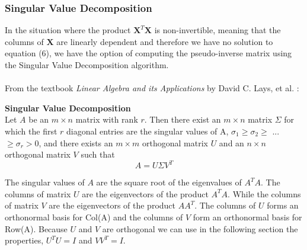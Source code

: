 \documentclass[a4paper,twocolumn]{article}
\newcommand{\X}{\mathbf{X}}
\begin{document}
\subsubsection{Singular Value Decomposition}
In the situation where the product $\X^{T}\X$ is non-invertible, meaning that the columns of $\X$ are linearly dependent and therefore we have no solution to equation (6), we have the option of computing the pseudo-inverse matrix using the Singular Value Decomposition algorithm.\\
\\
From the textbook \textit{Linear Algebra and its Applications} by David C. Lays, et al. \cite{linalg}:
\begin{tcolorbox}[colback=blue!8]
\textbf{Singular Value Decomposition}\\
Let $A$ be an $m \times n$ matrix with rank $r$. Then there exist an $m \times n$ matrix $\Sigma$ for which the first $r$ diagonal entries are the singular values of A, $\sigma_{1} \geq \sigma_{2} \geq$ ... $\geq \sigma_{r} > 0$, and there exists an $m \times m$ orthogonal matrix $U$ and an $n\times n$ orthogonal matrix $V$ such that 
$$
A = U\Sigma V^{T}
$$
\end{tcolorbox}
\noindent The singular values of $A$ are the square root of the eigenvalues of $A^{T}A$. The columns of matrix $U$ are the eigenvectors of the product $A^{T}A$. While the columns of matrix $V$ are the eigenvectors of the product $AA^{T}$. The columns of $U$ forms an orthonormal basis for Col(A) and the columns of $V$ form an orthonormal basis for Row(A). Because $U$ and $V$ are orthogonal we can use in the following section the properties, $U^{T}U=I$ and $VV^{T}=I$.
\end{document}
